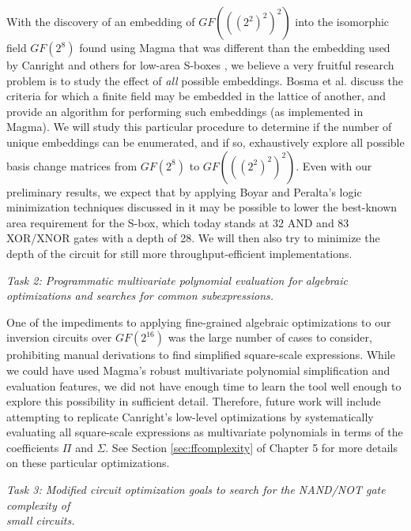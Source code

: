 With the discovery of an embedding of $GF(((2^2)^2)^2)$ into the isomorphic field $GF(2^8)$ found using Magma that was different than the embedding used by Canright and others for low-area S-boxes \cite{Canright05-1, Boyar12-1}, we believe a very fruitful research problem is to study the effect of \emph{all} possible embeddings. Bosma et al. \cite{Bosma97-1} discuss the criteria for which a finite field may be embedded in the lattice of another, and provide an algorithm for performing such embeddings (as implemented in Magma). We will study this particular procedure to determine if the number of unique embeddings can be enumerated, and if so, exhaustively explore all possible basis change matrices from $GF(2^8)$ to $GF(((2^2)^2)^2)$. Even with our preliminary results, we expect that by applying Boyar and Peralta's logic minimization techniques discussed in \cite{Boyar12-1} it may be possible to lower the best-known area requirement for the S-box, which today stands at 32 AND and 83 XOR/XNOR gates with a depth of 28. We will then also try to minimize the depth of the circuit for still more throughput-efficient implementations. 

\vspace*{1em}
\begin{minipage}{.9\textwidth}
  \emph{Task 2: Programmatic multivariate polynomial evaluation for algebraic optimizations and searches for common subexpressions.}
\end{minipage}
\vspace*{1em}

One of the impediments to applying fine-grained algebraic optimizations to our inversion circuits over $GF(2^{16})$ was the large number of cases to consider, prohibiting manual derivations to find simplified square-scale expressions. While we could have used Magma's robust multivariate polynomial simplification and evaluation features, we did not have enough time to learn the tool well enough to explore this possibility in sufficient detail. Therefore, future work will include attempting to replicate Canright's low-level optimizations by systematically evaluating all square-scale expressions as multivariate polynomials in terms of the coefficients $\Pi$ and $\Sigma$. See Section \ref{sec:ffcomplexity} of Chapter 5 for more details on these particular optimizations.

\vspace*{1em}
\begin{minipage}{9.\textwidth}
	\emph{Task 3: Modified circuit optimization goals to search for the NAND/NOT gate complexity of \\small circuits. \\}
\end{minipage}

